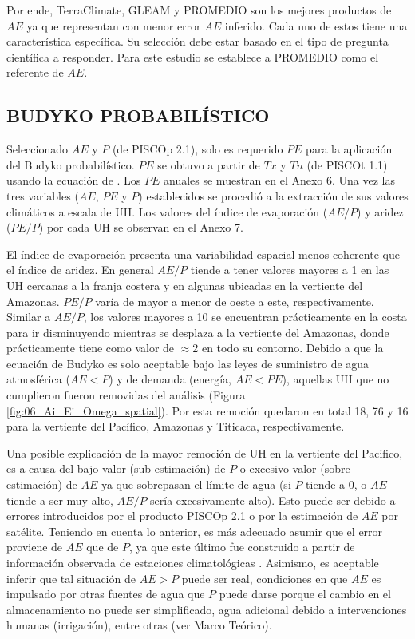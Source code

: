 \documentclass[12pt]{article}
\begin{document}
Por ende, TerraClimate, GLEAM y PROMEDIO son los mejores productos de $AE$ ya que representan con menor error $AE$ inferido. Cada uno de estos tiene una característica específica. Su selección debe estar basado en el tipo de pregunta científica a responder. Para este estudio se establece a PROMEDIO como el referente de $AE$.

\thispagestyle{empty}

\subsection{BUDYKO PROBABILÍSTICO}

Seleccionado $AE$ y $P$ (de PISCOp 2.1), solo es requerido $PE$ para la aplicación del Budyko probabilístico. $PE$ se obtuvo a partir de $Tx$ y $Tn$ (de PISCOt 1.1) usando la ecuación de \citet{Hargreaves1985}. Los $PE$ anuales se muestran en el Anexo 6. Una vez las tres variables ($AE$, $PE$ y $P$) establecidos se procedió a la extracción de sus valores climáticos a escala de UH. Los valores del índice de evaporación ($AE/P$) y aridez ($PE/P$) por cada UH se observan en el Anexo 7. 

El índice de evaporación presenta una variabilidad espacial menos coherente que el índice de aridez. En general $AE/P$ tiende a tener valores mayores a 1 en las UH cercanas a la franja costera y en algunas ubicadas en la vertiente del Amazonas. $PE/P$ varía de mayor a menor de oeste a este, respectivamente. Similar a $AE/P$, los valores mayores a 10 se encuentran prácticamente en la costa para ir disminuyendo mientras se desplaza a la vertiente del Amazonas, donde prácticamente tiene como valor de $\approx$2 en todo su contorno. Debido a que la ecuación de Budyko es solo aceptable bajo las leyes de suministro de agua atmosférica ($AE < P$) y de demanda (energía, $AE < PE$), aquellas UH que no cumplieron fueron removidas del análisis (Figura \ref{fig:06_Ai_Ei_Omega_spatial}). Por esta remoción quedaron en total 18, 76 y 16 para la vertiente del Pacífico, Amazonas y Titicaca, respectivamente.

Una posible explicación de la mayor remoción de UH en la vertiente del Pacifico, es a causa del bajo valor (sub-estimación) de $P$ o excesivo valor (sobre-estimación) de $AE$ ya que sobrepasan el límite de agua (si $P$ tiende a 0, o $AE$ tiende a ser muy alto, $AE/P$ sería excesivamente alto). Esto puede ser debido a errores introducidos por el producto PISCOp 2.1 o por la estimación de $AE$ por satélite. Teniendo en cuenta lo anterior, es más adecuado asumir que el error proviene de $AE$ que de $P$, ya que este último fue construido a partir de información observada de estaciones climatológicas \citep{Aybar2019}. Asimismo, es aceptable inferir que tal situación de $AE > P$ puede ser real, condiciones en que $AE$ es impulsado por otras fuentes de agua que $P$ puede darse porque el cambio en el almacenamiento no puede ser simplificado, agua adicional debido a intervenciones humanas (irrigación), entre otras (ver Marco Teórico).
 
\end{document}
